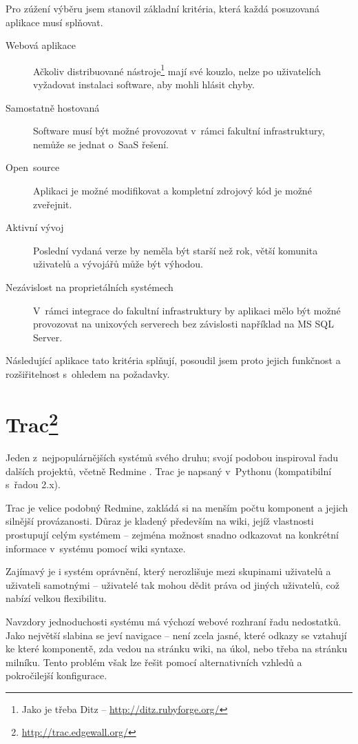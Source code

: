 \documentclass[thesis=B,czech]{FITthesis}[2012/05/02]
\begin{document}
Pro zúžení výběru jsem stanovil základní kritéria, která každá
posuzovaná aplikace musí splňovat.

\begin{description}
\item[Webová aplikace]
  Ačkoliv distribuované nástroje\footnote{Jako je třeba Ditz -- \url{http://ditz.rubyforge.org/}} mají své kouzlo,
  nelze po uživatelích vyžadovat instalaci software, aby mohli hlásit
  chyby.
\item[Samostatně hostovaná]
  Software musí být možné provozovat v~rámci
  fakultní infrastruktury, nemůže se jednat o~\gls{SaaS} řešení.
\item[Open~source]
  Aplikaci je možné modifikovat a kompletní zdrojový kód
  je možné zveřejnit.
\item[Aktivní vývoj]
  Poslední vydaná verze by neměla být starší než rok,
  větší komunita uživatelů a vývojářů může být výhodou.
\item[Nezávislost na proprietálních systémech]
  V~rámci integrace do
  fakultní infrastruktury by aplikaci mělo být možné provozovat na
  unixových serverech bez závislosti například na MS SQL Server.
\end{description}
Následující aplikace tato kritéria splňují, posoudil jsem proto jejich
funkčnost a rozšiřitelnost s~ohledem na požadavky.

\section[Trac]{Trac\footnote{\url{http://trac.edgewall.org/}}}

Jeden z~nejpopulárnějších systémů svého druhu; svojí podobou inspiroval
řadu dalších projektů, včetně Redmine \citep{TracRedMine}. Trac je
napsaný v~Pythonu (kompatibilní s~řadou 2.x).

Trac je velice podobný Redmine, zakládá si na menším počtu komponent a
jejich silnější provázanosti. Důraz je kladený především na wiki, jejíž
vlastnosti prostupují celým systémem -- zejména možnost snadno
odkazovat na konkrétní informace v~systému pomocí wiki syntaxe.

Zajímavý je i systém oprávnění, který nerozlišuje mezi skupinami
uživatelů a uživateli samotnými -- uživatelé tak mohou dědit práva od
jiných uživatelů, což nabízí velkou flexibilitu.

Navzdory jednoduchosti systému má výchozí webové rozhraní řadu
nedostatků. Jako největší slabina se jeví navigace -- není zcela jasné,
které odkazy se vztahují ke které komponentě, zda vedou na stránku wiki,
na úkol, nebo třeba na stránku milníku. Tento problém však lze řešit
pomocí alternativních vzhledů a pokročilejší konfigurace.
\end{document}
